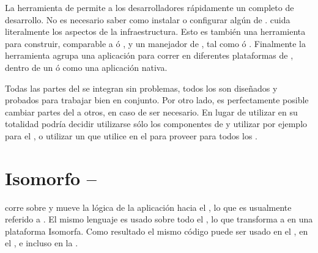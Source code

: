 La herramienta \clitool de \meteor permite a los desarrolladores rápidamente \setup un \environment completo de desarrollo. No es necesario saber como instalar o configurar algún \software de \serverAS. \meteor cuida literalmente los aspectos de la infraestructura. Esto es también una herramienta para construir, comparable a \maketool ó \grunttool, y un manejador de \package, tal como \apttool ó \npm. Finalmente la herramienta \clitool agrupa una aplicación para correr en diferentes plataformas de \clientsAS, dentro de un \browser \web ó como una aplicación \mobile nativa.

Todas las partes del \stack se integran sin problemas, todos los \packages \coreAS son diseñados y probados para trabajar bien en conjunto. Por otro lado, es perfectamente posible cambiar partes del \stack a otros, en caso de ser necesario. En lugar de utilizar \meteor en su totalidad podría decidir utilizarse sólo los componentes de \serverAS y utilizar por ejemplo \angularjs para el \clientSide, o utilizar un \javabackend que utilice \meteor en el \frontEndAS para proveer \updates \realTimeINT para todos los \clientsAS.

\section{\framework Isomorfo – \fullstack \javaScriptNAME}

\meteor corre sobre \nodejsNAME y mueve la lógica de la aplicación hacia el \browser, lo que es usualmente referido a \singlePageApp. El mismo lenguaje es usado sobre todo el \stack, lo que transforma a \meteor en una plataforma Isomorfa. Como resultado el mismo código \javaScriptNAME puede ser usado en el \serverAS, en el \clientAS, e incluso en la \dataBase.

